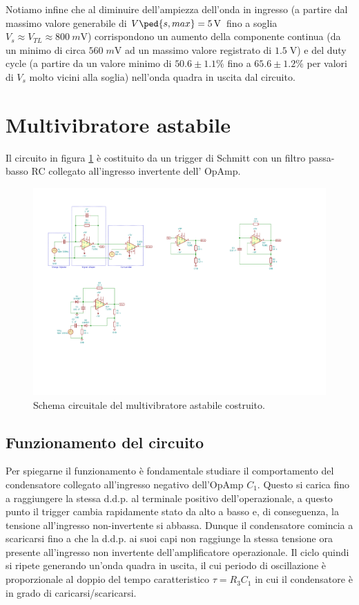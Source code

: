 \documentclass[10pt, a4paper, italian]{article}
\begin{document}
Notiamo infine che al diminuire dell'ampiezza dell'onda in ingresso (a partire
dal massimo valore generabile di $V\ped{s, max} = \SI{5}{\V}$ fino a soglia
$V_s \approx V_{TL} \approx \SI{800}{m\V}$)
corrispondono un aumento della componente continua (da un minimo di circa
$560 \; \si{m\V}$ ad un massimo valore registrato di $1.5 \; \si{\V}$) e del
duty cycle (a partire da un valore minimo di $50.6 \pm 1.1 \%$ fino a
$65.6 \pm 1.2 \%$ per valori di $V_s$ molto vicini alla soglia) nell'onda
quadra in uscita dal circuito.

\section{Multivibratore astabile}
Il circuito in figura \ref{fig: astableschm} è costituito da un trigger di
Schmitt con un filtro passa-basso RC collegato all'ingresso invertente dell'
OpAmp.
\begin{figure}[htbp]
    \centering
	\includegraphics[scale=1.5]{astable}
    \caption{Schema circuitale del multivibratore astabile costruito.
    \label{fig: astableschm}}
\end{figure}

\subsection{Funzionamento del circuito}
Per spiegarne il funzionamento è fondamentale studiare il comportamento del
condensatore collegato all'ingresso negativo dell'OpAmp $C_1$. Questo si
carica fino a raggiungere la stessa d.d.p. al terminale positivo
dell'operazionale, a questo punto il trigger cambia rapidamente stato da alto
a basso e, di conseguenza, la tensione all'ingresso non-invertente si abbassa.
Dunque il condensatore comincia a scaricarsi fino a che la d.d.p. ai suoi capi
non raggiunge la stessa tensione ora presente all'ingresso non invertente
dell'amplificatore operazionale.
Il ciclo quindi si ripete generando un'onda quadra in uscita, il cui
periodo di oscillazione è proporzionale al doppio del tempo caratteristico
$\tau = R_3 C_1$ in cui il condensatore è in grado di caricarsi/scaricarsi.
\end{document}
